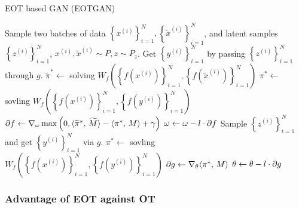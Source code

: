 \begin{algorithm}
  \caption{EOT based GAN (EOTGAN)}\label{algo-eWGAN}
  \begin{algorithmic}[1]
    \STATE Sample two batches of data $ \left\{ x^{(i)}
    \right\}_{i=1}^{N}, \left\{ \tilde{x}^{(i)} \right\}_{i=1}^{N}  $,
    and latent samples $\left\{ z^{(i)} \right\}_{i=1}^{N} $,
    $x^{(i)},\tilde{x}^{(i)} \sim P, z\sim P_{z}$.
    \STATE Get $ \left\{ y^{(i)} \right\}_{i=1}^{N}$ by passing
    $\left\{ z^{(i)} \right\}_{i=1}^{N}$ through $g$.
    \STATE $\widetilde{\pi}^{\ast} \gets$ solving $ W_f\left( \left\{ f(x^{(i)})
      \right\}_{i=1}^{N} , \left\{ f(\tilde{x}^{(i)})
      \right\}_{i=1}^{N}\right)$
    \STATE ${\pi}^{\ast} \gets$ sovling $W_f\left( \left\{ f(x^{(i)})
      \right\}_{i=1}^{N}, \left\{ f({y}^{(i)})
      \right\}_{i=1}^{N} \right)$
    \STATE $\partial{f} \gets \nabla_{\omega} \max\left(0,  \langle \widetilde{\pi}^{\ast},\,\widetilde{M}\rangle-\langle {\pi^{\ast}},\,{M}\rangle+ \gamma\right)$
    \STATE $\omega \gets \omega - l \cdot \partial{f}$
    \STATE Sample $\left\{ z^{(i)} \right\}_{i=1}^{N}$
    and get $ \left\{ y^{(i)} \right\}_{i=1}^{N}$ via $g$.
    \STATE $\pi^{\ast} \gets$ sovling $W_f\left( \left\{ f(x^{(i)})
      \right\}_{i=1}^{N}, \left\{ f({y}^{(i)})
      \right\}_{i=1}^{N} \right)$
    \STATE $\partial{g} \gets \nabla_{\theta} \langle \pi^{\ast},\,M\rangle$
    \STATE $\theta \gets \theta -l \cdot \partial{g}$
    \ENDWHILE
  \end{algorithmic}
\end{algorithm}

\subsubsection{Advantage of EOT against OT}

